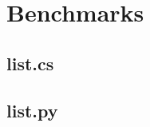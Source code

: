 \documentclass[10pt,a4paper]{article}
\begin{document}
\pagestyle{empty} 


\newpage

\setcounter{secnumdepth}{2} 
\setcounter{tocdepth}{2}


\setcounter{page}{1}
\pagestyle{plain}

\begin{multicols}{2}
\tableofcontents




















\printbibliography
\end{multicols}
\newpage

\setcounter{section}{0}
\renewcommand\thesection{\Alph{section}}

%


\section{Benchmarks}
\subsection{list.cs}

\subsection{list.py}

\end{document}
